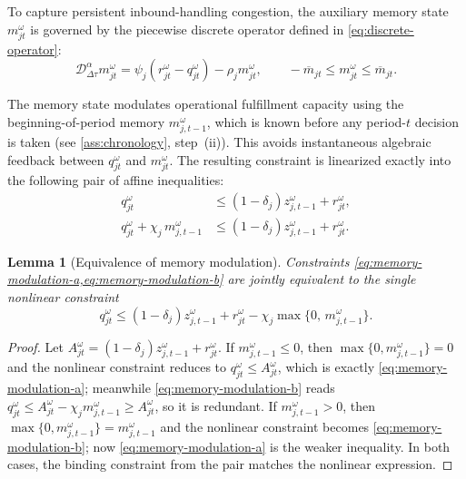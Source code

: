 \documentclass[11pt,a4paper]{article}
\newtheorem{lemma}{Lemma}
\begin{document}
To capture persistent inbound-handling congestion, the auxiliary memory
state \(m_{jt}^{\omega}\) is governed by the piecewise discrete operator
defined in \cref{eq:discrete-operator}:
\begin{equation}
  \mathcal{D}_{\Delta\tau}^{\alpha}m_{jt}^{\omega}
  =
  \psi_j\left(r_{jt}^{\omega}-q_{jt}^{\omega}\right)
  -
  \rho_jm_{jt}^{\omega},
  \qquad
  -\overline{m}_{jt}\leq m_{jt}^{\omega}\leq\overline{m}_{jt}.
  \label{eq:discrete-fractional-balance}
\end{equation}

The memory state modulates operational fulfillment capacity using the
beginning-of-period memory \(m_{j,t-1}^{\omega}\), which is known before
any period-\(t\) decision is taken (see
\cref{ass:chronology}, step~(ii)). This avoids instantaneous algebraic
feedback between \(q_{jt}^{\omega}\) and \(m_{jt}^{\omega}\). The
resulting constraint is linearized exactly into the following pair of
affine inequalities:
\begin{subequations}
\label{eq:memory-modulation}
\begin{align}
  q_{jt}^{\omega}
  &\leq
  (1-\delta_j)z_{j,t-1}^{\omega}
  +
  r_{jt}^{\omega},
  \label{eq:memory-modulation-a}\\
  q_{jt}^{\omega}
  +
  \chi_j\,m_{j,t-1}^{\omega}
  &\leq
  (1-\delta_j)z_{j,t-1}^{\omega}
  +
  r_{jt}^{\omega}.
  \label{eq:memory-modulation-b}
\end{align}
\end{subequations}

\begin{lemma}[Equivalence of memory modulation]
\label{lem:max-linearization}
Constraints \cref{eq:memory-modulation-a,eq:memory-modulation-b} are
jointly equivalent to the single nonlinear constraint
\[
  q_{jt}^{\omega}
  \leq
  (1-\delta_j)z_{j,t-1}^{\omega}
  +
  r_{jt}^{\omega}
  -
  \chi_j\max\{0,\,m_{j,t-1}^{\omega}\}.
\]
\end{lemma}

\begin{proof}
Let \(A_{jt}^{\omega}=(1-\delta_j)z_{j,t-1}^{\omega}+r_{jt}^{\omega}\).
If \(m_{j,t-1}^{\omega}\leq 0\), then
\(\max\{0,m_{j,t-1}^{\omega}\}=0\) and the nonlinear constraint reduces
to \(q_{jt}^{\omega}\leq A_{jt}^{\omega}\), which is exactly
\cref{eq:memory-modulation-a}; meanwhile
\cref{eq:memory-modulation-b} reads
\(q_{jt}^{\omega}\leq A_{jt}^{\omega}-\chi_jm_{j,t-1}^{\omega}\geq
A_{jt}^{\omega}\), so it is redundant.
If \(m_{j,t-1}^{\omega}>0\), then
\(\max\{0,m_{j,t-1}^{\omega}\}=m_{j,t-1}^{\omega}\) and the nonlinear
constraint becomes \cref{eq:memory-modulation-b}; now
\cref{eq:memory-modulation-a} is the weaker inequality.
In both cases, the binding constraint from the pair matches the
nonlinear expression.
\end{proof}
\end{document}
